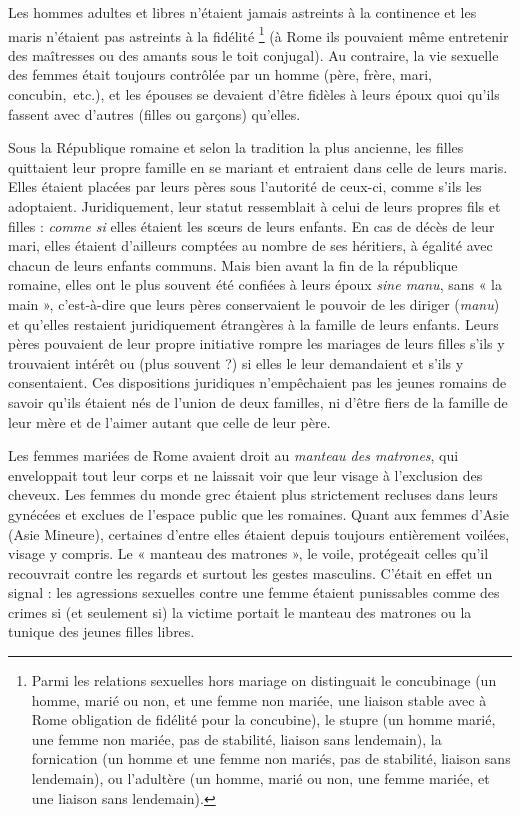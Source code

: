Les hommes adultes et libres n'étaient jamais astreints à la continence
et les maris n'étaient pas astreints à la fidélité%
\footnote{Parmi les relations sexuelles hors mariage on distinguait le concubinage (un homme, marié ou non, et une
femme non mariée, une liaison stable avec à Rome obligation de fidélité pour la concubine), le stupre (un homme 
marié, une femme non mariée, pas de stabilité, liaison sans lendemain), la fornication (un homme et une femme 
non mariés, pas de stabilité, liaison sans lendemain), ou l'adultère (un homme, marié ou non, une femme mariée, 
et une liaison sans lendemain).}
(à Rome ils pouvaient
même entretenir des maîtresses ou des amants sous le toit conjugal).
Au contraire, la vie sexuelle des femmes était toujours contrôlée par
un homme (père, frère, mari, concubin,~etc.), et les épouses se devaient
d'être fidèles à leurs époux quoi qu'ils fassent avec d'autres (filles ou garçons)
qu'elles.

Sous la République romaine et selon la tradition la plus ancienne,
les filles quittaient leur propre famille en se mariant et entraient dans celle
de leurs maris. Elles étaient placées par leurs pères sous l'autorité de
ceux-ci, comme s'ils les adoptaient. Juridiquement, leur statut ressemblait
à celui de leurs propres fils et filles : \emph{comme si} elles étaient les sœurs de
leurs enfants. En cas de décès de leur mari, elles étaient d'ailleurs comptées
au nombre de ses héritiers, à égalité avec chacun de leurs enfants
communs. Mais bien avant la fin de la république romaine, elles ont le
plus souvent été confiées à leurs époux \emph{sine manu}, sans « la main », c'est-à-dire
que leurs pères conservaient le pouvoir de les diriger (\emph{manu}) et
qu'elles restaient juridiquement étrangères à la famille de leurs enfants.
Leurs pères pouvaient de leur propre initiative rompre les mariages de
leurs filles s'ils y trouvaient intérêt ou (plus souvent ?) si elles le leur demandaient
et s'ils y consentaient. Ces dispositions juridiques n'empêchaient
pas les jeunes romains de savoir qu'ils étaient nés de l'union de
deux familles, ni d'être fiers de la famille de leur mère et de l'aimer autant
que celle de leur père.

Les femmes mariées de Rome avaient droit au \emph{manteau des matrones},
qui enveloppait tout leur corps et ne laissait voir que leur visage à l'exclusion
des cheveux. Les femmes du monde grec étaient plus strictement
recluses dans leurs gynécées et exclues de l'espace public que les romaines.
Quant aux femmes d'Asie (Asie Mineure), certaines d'entre elles
étaient depuis toujours entièrement voilées, visage y compris. Le
« manteau des matrones », le voile, protégeait celles qu'il recouvrait
contre les regards et surtout les gestes masculins. C'était en effet un signal :
les agressions sexuelles contre une femme étaient punissables
comme des crimes si (et seulement si) la victime portait le manteau des
matrones ou la tunique des jeunes filles libres.

